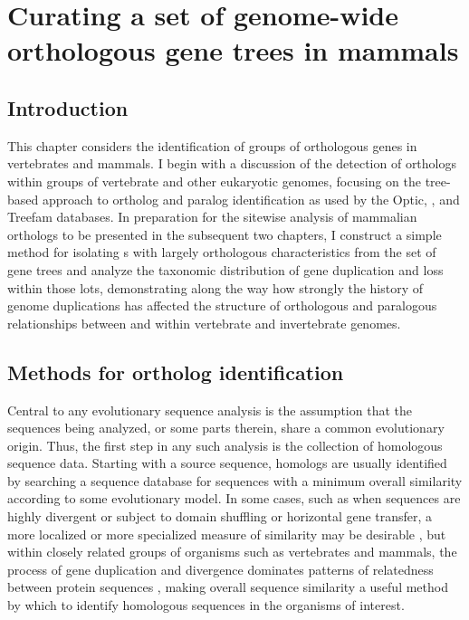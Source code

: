 \chapter{Curating a set of genome-wide orthologous gene trees in mammals}
\label{ch_orthologs}

\section{Introduction}

This chapter considers the identification of groups of orthologous
genes in vertebrates and mammals. I begin with a discussion of the
detection of orthologs within groups of vertebrate and other
eukaryotic genomes, focusing on the tree-based approach to ortholog
and paralog identification as used by the Optic, \cmp, and Treefam
databases. In preparation for the sitewise analysis of mammalian
orthologs to be presented in the subsequent two chapters, I construct
a simple method for isolating \subtr{}s with largely orthologous
characteristics from the set of \cmp gene trees and analyze the
taxonomic distribution of gene duplication and loss within those
\acp{lot}, demonstrating along the way how strongly the history of
genome duplications has affected the structure of orthologous and
paralogous relationships between and within vertebrate and
invertebrate genomes.

\section{Methods for ortholog identification}

Central to any evolutionary sequence analysis is the assumption that
the sequences being analyzed, or some parts therein, share a common
evolutionary origin. Thus, the first step in any such analysis is the
collection of homologous sequence data. Starting with a source
sequence, homologs are usually identified by searching a sequence
database for sequences with a minimum overall similarity according to
some evolutionary model. In some cases, such as when sequences are
highly divergent or subject to domain shuffling or horizontal gene
transfer, a more localized or more specialized measure of similarity
may be desirable \citep{Koonin2001,Sjolander2011}, but within closely
related groups of organisms such as vertebrates and mammals, the
process of gene duplication and divergence dominates patterns of
relatedness between protein sequences \citep{Ohno1970}, making overall
sequence similarity a useful method by which to identify homologous
sequences in the organisms of interest.

